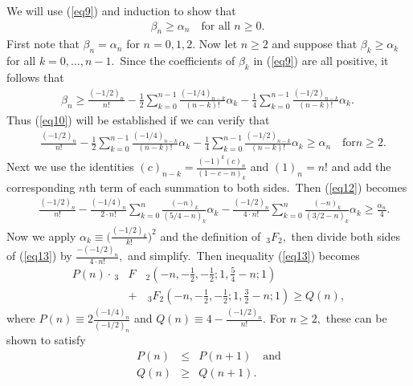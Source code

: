 \documentclass[final,oneeqnum]{siamltex}
\begin{document}
\noindent We will use (\ref{eq9}) and induction to
show that 
\begin{eqnarray}
\beta_{n} \geq \alpha_{n} \quad \mbox{for all $n\geq 0$}.\ 
\label{eq10}
\end{eqnarray} 
First note that $\beta_{n} = \alpha_{n}$ for $n=0,1,2$.
Now let $n\geq 2$ and suppose that
$\beta_{k} \geq \alpha_{k}$ for all $k=0,\ldots, n-1$.\ Since the
coefficients of
$\beta_{k}$ in (\ref{eq9}) are all
positive, it follows that
\begin{eqnarray}
\beta_{n} \geq \frac{(-1/2)_{n}}{n!} -
\frac{1}{2}\sum_{k=0}^{n-1}\frac{(-1/4)_{n-k}}{(n-k)!}\alpha_{k}-
\frac{1}{4}\sum_{k=0}^{n-1}\frac{(-1/2)_{n-k}}{(n-k)!}\alpha_{k}.\ \nonumber
\end{eqnarray} 
Thus (\ref{eq10}) will be established if we can verify that
\begin{eqnarray}
\quad \frac{(-1/2)_{n}}{n!} -
\frac{1}{2}\sum_{k=0}^{n-1}\frac{(-1/4)_{n-k}}{(n-k)!}\alpha_{k}-
\frac{1}{4}\sum_{k=0}^{n-1}
\frac{(-1/2)_{n-k}}{(n-k)!}\alpha_{k}\geq \alpha_{n} \quad \mbox{for
$n\geq 2$}.\ 
\label{eq12}
\end{eqnarray}
Next we use the identities
$(c)_{n-k} = \frac{(-1)^{k}(c)_{n}}{(1-c-n)_{k}}$ and
$(1)_{n} = n!$ and add the corresponding $n$th term of each
summation to both sides.\ Then (\ref{eq12}) becomes
\begin{eqnarray}
\quad \frac{(-1/2)_{n}}{n!} -
\frac{(-1/4)_{n}}{2\cdot
n!}\sum_{k=0}^{n}\frac{(-n)_{k}}{(5/4-n)_{k}}\alpha_{k}-
\frac{(-1/2)_{n}}{4\cdot
n!}\sum_{k=0}^{n}\frac{(-n)_{k}}{(3/2-n)_{k}}\alpha_{k}\geq
\frac{\alpha_{n}}{4}.
\label{eq13}
\end{eqnarray} 
Now we apply
$\alpha_{k} \equiv \big(\frac{(-1/2)_{k}}{k!}\big)^2$
 and the definition of  $\,_{3}F_{2},$ then divide both
sides of  (\ref{eq13}) by $\frac{-(-1/2)_{n}}{4\cdot n!},$
 and simplify.\ Then inequality (\ref{eq13})
 becomes
\begin{eqnarray}
 P(n)\cdot\,_{3}&F&_{2}\left(-n,-\frac{1}{2},-\frac{1}{2};1,\frac{5}{4}
-n;1\right) \nonumber \\&+&
\,_{3}F_{2}\left(-n,-\frac{1}{2},-\frac{1}{2};1,\frac{3}{2} -n;1\right)
\geq Q(n), \label{eq16}
\end{eqnarray} 
where $P(n) \equiv 2\frac{(-1/4)_{n}}{(-1/2)_{n}}$
 and $Q(n) \equiv 4-\frac{(-1/2)_{n}}{n!}$.
For $n\geq 2,$ these can be shown to satisfy
\begin{eqnarray} 
P(n) &\leq& P(n+1) \quad \mbox{and} \label{eq16.1}\\ Q(n)
&\geq& Q(n+1).
\label{eq16.2}
\end{eqnarray}  
\end{document}
